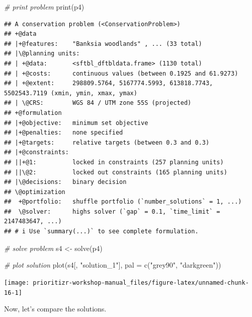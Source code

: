 \documentclass[
  12pt,
]{book}
\newenvironment{Shaded}{\begin{snugshade}}{\end{snugshade}}
\newcommand{\AttributeTok}[1]{\textcolor[rgb]{0.77,0.63,0.00}{#1}}
\newcommand{\CommentTok}[1]{\textcolor[rgb]{0.56,0.35,0.01}{\textit{#1}}}
\newcommand{\FunctionTok}[1]{\textcolor[rgb]{0.00,0.00,0.00}{#1}}
\newcommand{\NormalTok}[1]{#1}
\newcommand{\OtherTok}[1]{\textcolor[rgb]{0.56,0.35,0.01}{#1}}
\newcommand{\StringTok}[1]{\textcolor[rgb]{0.31,0.60,0.02}{#1}}
\begin{document}
\begin{Shaded}
\begin{Highlighting}[]
\CommentTok{\# print problem}
\FunctionTok{print}\NormalTok{(p4)}
\end{Highlighting}
\end{Shaded}

\begin{verbatim}
## A conservation problem (<ConservationProblem>)
## +@data
## |+@features:    "Banksia woodlands" , ... (33 total)
## |\@planning units:
## | +@data:       <sftbl_dftbldata.frame> (1130 total)
## | +@costs:      continuous values (between 0.1925 and 61.9273)
## | +@extent:     298809.5764, 5167774.5993, 613818.7743, 5502543.7119 (xmin, ymin, xmax, ymax)
## | \@CRS:        WGS 84 / UTM zone 55S (projected)
## +@formulation
## |+@objective:   minimum set objective
## |+@penalties:   none specified
## |+@targets:     relative targets (between 0.3 and 0.3)
## |+@constraints:
## ||+@1:          locked in constraints (257 planning units)
## ||\@2:          locked out constraints (165 planning units)
## |\@decisions:   binary decision
## \@optimization
##  +@portfolio:   shuffle portfolio (`number_solutions` = 1, ...)
##  \@solver:      highs solver (`gap` = 0.1, `time_limit` = 2147483647, ...)
## # i Use `summary(...)` to see complete formulation.
\end{verbatim}

\begin{Shaded}
\begin{Highlighting}[]
\CommentTok{\# solve problem}
\NormalTok{s4 }\OtherTok{\textless{}{-}} \FunctionTok{solve}\NormalTok{(p4)}

\CommentTok{\# plot solution}
\FunctionTok{plot}\NormalTok{(s4[, }\StringTok{"solution\_1"}\NormalTok{],  }\AttributeTok{pal =} \FunctionTok{c}\NormalTok{(}\StringTok{"grey90"}\NormalTok{, }\StringTok{"darkgreen"}\NormalTok{))}
\end{Highlighting}
\end{Shaded}

\begin{center}\texttt{[image: prioritizr-workshop-manual\_files/figure-latex/unnamed-chunk-16-1]} \end{center}

Now, let's compare the solutions.
\end{document}
